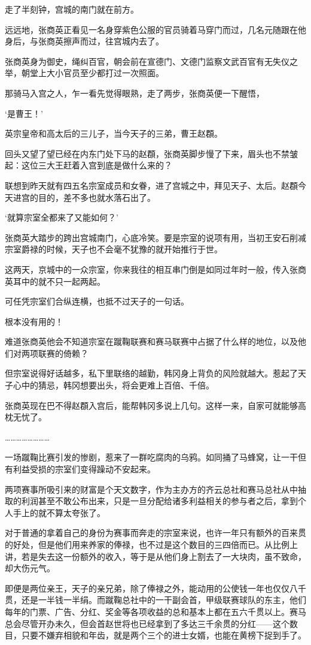 走了半刻钟，宫城的南门就在前方。

远远地，张商英正看见一名身穿紫色公服的官员骑着马穿门而过，几名元随跟在他身后，与张商英擦声而过，往宫城内去了。

张商英身为御史，绳纠百官，朝会前在宣德门、文德门监察文武百官有无失仪之举，朝堂上大小官员至少都打过一次照面。

那骑马入宫之人，乍一看先觉得眼熟，走了两步，张商英便一下醒悟，

‘是曹王！’

英宗皇帝和高太后的三儿子，当今天子的三弟，曹王赵頵。

回头又望了望已经在内东门处下马的赵頵，张商英脚步慢了下来，眉头也不禁皱起：这位三大王赶着入宫到底是做什么来的？

联想到昨天就有四五名宗室成员和女眷，进了宫城之中，拜见天子、太后。赵頵今天进宫的目的，差不多也就水落石出了。

‘就算宗室全都来了又能如何？’

张商英大踏步的跨出宫城南门，心底冷笑。要是宗室的说项有用，当初王安石削减宗室爵禄的时候，天子也不会毫不犹豫的就开始推行于世。

这两天，京城中的一众宗室，你来我往的相互串门倒是如同过年时一般，传入张商英耳中的就不只一起两起。

可任凭宗室们合纵连横，也抵不过天子的一句话。

根本没有用的！

难道张商英他会不知道宗室在蹴鞠联赛和赛马联赛中占据了什么样的地位，以及他们对两项联赛的倚赖？

但宗室说得好话越多，私下里联络的越勤，韩冈身上背负的风险就越大。惹起了天子心中的猜忌，韩冈想要出头，将会更难上百倍、千倍。

张商英现在巴不得赵頵入宫后，能帮韩冈多说上几句。这样一来，自家可就能够高枕无忧了。

……………………

一场蹴鞠比赛引发的惨剧，惹来了一群吃腐肉的乌鸦。如同捅了马蜂窝，让一干但有利益受损的宗室们变得躁动不安起来。

两项赛事所吸引来的财富是个天文数字，作为主办方的齐云总社和赛马总社从中抽取的利润甚至不敢公布出来，只是一旦分配给诸多利益相关的参与者之后，拿到个人手上的就不算太夸张了。

对于普通的拿着自己的身份为赛事而奔走的宗室来说，也许一年只有额外的百来贯的好处，但是他们用来养家的俸禄，也不过是这个数目的三四倍而已。从比例上讲，若是失去这一份额外的收入，等于是从他们身上割去了一大块肉，虽不致命，却大伤元气。

即便是两位亲王，天子的亲兄弟，除了俸禄之外，能动用的公使钱一年也仅仅八千贯，还是一半钱一半绢。而蹴鞠总社中的一干副会首，甲级联赛球队的东主，他们每年的门票、广告、分红、奖金等各项收益的总和基本上都在五六千贯以上。赛马总会尽管开办未久，但会首赵世将也已经拿到了多达三千余贯的分红——这个数目，只要不嫌弃相貌和年齿，就是两个三个的进士女婿，也能在黄榜下捉到手了。

